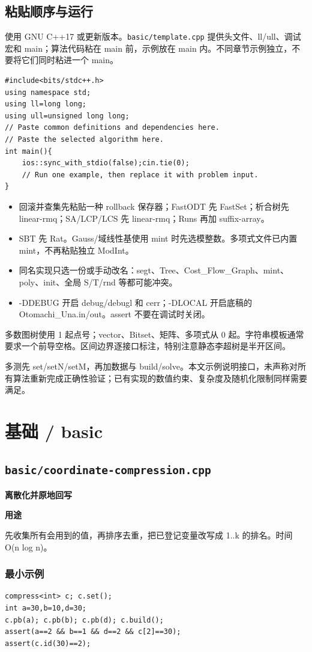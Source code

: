 \documentclass[UTF8,a4paper,10pt]{ctexart}
\newcommand{\TemplUsage}[1]{\textbf{用途}\par #1\par}
\begin{document}
\subsection*{粘贴顺序与运行}
使用 GNU C++17 或更新版本。\texttt{basic/template.cpp} 提供头文件、ll/ull、调试宏和 main；算法代码粘在 main 前，示例放在 main 内。不同章节示例独立，不要将它们同时粘进一个 main。
\begin{lstlisting}
#include<bits/stdc++.h>
using namespace std;
using ll=long long;
using ull=unsigned long long;
// Paste common definitions and dependencies here.
// Paste the selected algorithm here.
int main(){
    ios::sync_with_stdio(false);cin.tie(0);
    // Run one example, then replace it with problem input.
}
\end{lstlisting}
\begin{itemize}
\item 回滚并查集先粘贴一种 rollback 保存器；FastODT 先 FastSet；析合树先 linear-rmq；SA/LCP/LCS 先 linear-rmq；Runs 再加 suffix-array。
\item SBT 先 Rat。Gauss/域线性基使用 mint 时先选模整数。多项式文件已内置 mint，不再粘贴独立 ModInt。
\item 同名实现只选一份或手动改名：segt、Tree、Cost\_Flow\_Graph、mint、poly、init、全局 S/T/rnd 等都可能冲突。
\item -DDEBUG 开启 debug/debugl 和 cerr；-DLOCAL 开启底稿的 Otomachi\_Una.in/out。assert 不要在调试时关闭。
\end{itemize}
多数图树使用 1 起点号；vector、Bitset、矩阵、多项式从 0 起。字符串模板通常要求一个前导空格。区间边界逐接口标注，特别注意静态李超树是半开区间。

多测先 set/setN/setM，再加数据与 build/solve。本文示例说明接口，未声称对所有算法重新完成正确性验证；已有实现的数值约束、复杂度及随机化限制同样需要满足。
\clearpage
\clearpage
\section{基础 / basic}
\subsection{\texttt{basic/coordinate-compression.cpp}}
\textbf{离散化并原地回写}\par
\TemplUsage{先收集所有会用到的值，再排序去重，把已登记变量改写成 1..k 的排名。时间 O(n log n)。}
\subsubsection*{最小示例}
\begin{lstlisting}
compress<int> c; c.set();
int a=30,b=10,d=30;
c.pb(a); c.pb(b); c.pb(d); c.build();
assert(a==2 && b==1 && d==2 && c[2]==30);
assert(c.id(30)==2);
\end{lstlisting}
\end{document}
